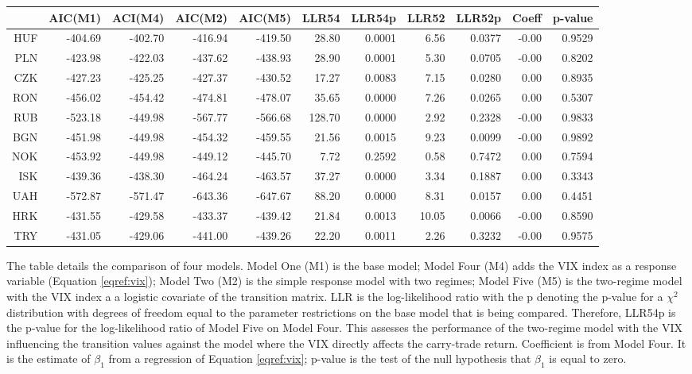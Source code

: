 \documentclass[12pt, a4paper, oneside]{article}\usepackage[]{graphicx}\usepackage[]{color}
\begin{document}
\begin{landscape}
\begin{table}[t]
\begin{threeparttable}
\centering
\begin{tabular}{rrrrrrrrrrr}
  \hline
 & AIC(M1) & ACI(M4) & AIC(M2) & AIC(M5) & LLR54 & LLR54p & LLR52 & LLR52p & Coeff & p-value \\ 
  \hline
HUF & -404.69 & -402.70 & -416.94 & -419.50 & 28.80 & 0.0001 & 6.56 & 0.0377 & -0.00 & 0.9529 \\ 
  PLN & -423.98 & -422.03 & -437.62 & -438.93 & 28.90 & 0.0001 & 5.30 & 0.0705 & -0.00 & 0.8202 \\ 
  CZK & -427.23 & -425.25 & -427.37 & -430.52 & 17.27 & 0.0083 & 7.15 & 0.0280 & 0.00 & 0.8935 \\ 
  RON & -456.02 & -454.42 & -474.81 & -478.07 & 35.65 & 0.0000 & 7.26 & 0.0265 & 0.00 & 0.5307 \\ 
  RUB & -523.18 & -449.98 & -567.77 & -566.68 & 128.70 & 0.0000 & 2.92 & 0.2328 & -0.00 & 0.9833 \\ 
  BGN & -451.98 & -449.98 & -454.32 & -459.55 & 21.56 & 0.0015 & 9.23 & 0.0099 & -0.00 & 0.9892 \\ 
  NOK & -453.92 & -449.98 & -449.12 & -445.70 & 7.72 & 0.2592 & 0.58 & 0.7472 & 0.00 & 0.7594 \\ 
  ISK & -439.36 & -438.30 & -464.24 & -463.57 & 37.27 & 0.0000 & 3.34 & 0.1887 & 0.00 & 0.3343 \\ 
  UAH & -572.87 & -571.47 & -643.36 & -647.67 & 88.20 & 0.0000 & 8.31 & 0.0157 & 0.00 & 0.4451 \\ 
  HRK & -431.55 & -429.58 & -433.37 & -439.42 & 21.84 & 0.0013 & 10.05 & 0.0066 & -0.00 & 0.8590 \\ 
  TRY & -431.05 & -429.06 & -441.00 & -439.26 & 22.20 & 0.0011 & 2.26 & 0.3232 & -0.00 & 0.9575 \\ 
   \hline
\end{tabular}
\begin{tablenotes}
\small
\item The table details the comparison of four models.  Model One (M1) is the base model; Model Four (M4) adds the VIX index as a response variable (Equation \ref{eqref:vix}); Model Two (M2) is the simple response model with two regimes; Model Five (M5) is the two-regime model with the VIX index a a logistic covariate of the transition matrix. LLR is the log-likelihood ratio with the p denoting the p-value for a $\chi^2$ distribution with degrees of freedom equal to the parameter restrictions on the base model that is being compared.  Therefore, LLR54p is the p-value for the log-likelihood ratio of Model Five on Model Four.  This assesses the performance of the two-regime model with the VIX influencing the transition values against the model where the VIX directly affects the carry-trade return. Coefficient is from Model Four.  It is the estimate of $\beta_1$ from a regression of Equation \ref{eqref:vix}; p-value is the test of the null hypothesis that $\beta_1$ is equal to zero. 

\end{tablenotes}
\end{threeparttable}
\end{table}
\end{landscape}
\end{document}
